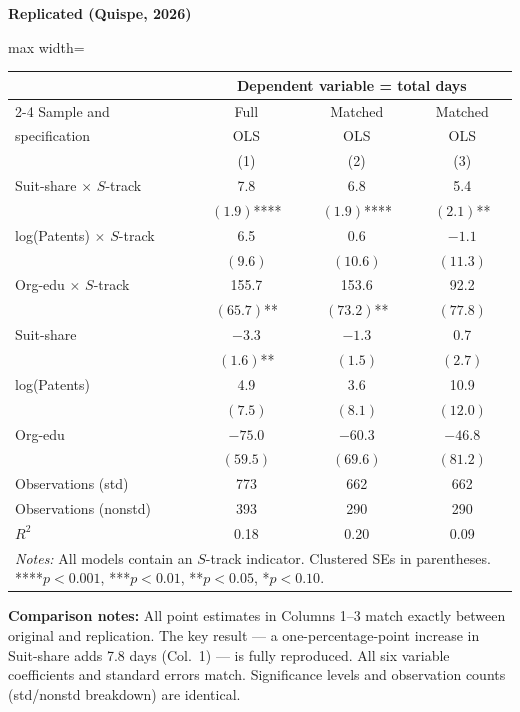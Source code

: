 \documentclass[11pt,a4paper]{article}
\begin{document}
\hfill
\begin{minipage}[t]{0.48\textwidth}
\centering
\textbf{\large Replicated (Quispe, 2026)}
\vspace{0.3cm}

\begin{adjustbox}{max width=\textwidth}
\begin{tabular}{lccc}
\toprule
 & \multicolumn{3}{c}{Dependent variable = total days} \\
\cmidrule(lr){2-4}
Sample and & Full & Matched & Matched \\
specification & OLS & OLS & OLS \\
 & (1) & (2) & (3) \\
\midrule
Suit-share $\times$ $S$-track & 7.8 & 6.8 & 5.4 \\
 & $(1.9)$**** & $(1.9)$**** & $(2.1)$** \\[0.3em]
log(Patents) $\times$ $S$-track & 6.5 & 0.6 & $-1.1$ \\
 & $(9.6)$ & $(10.6)$ & $(11.3)$ \\[0.3em]
Org-edu $\times$ $S$-track & 155.7 & 153.6 & 92.2 \\
 & $(65.7)$** & $(73.2)$** & $(77.8)$ \\[0.3em]
Suit-share & $-3.3$ & $-1.3$ & 0.7 \\
 & $(1.6)$** & $(1.5)$ & $(2.7)$ \\[0.3em]
log(Patents) & 4.9 & 3.6 & 10.9 \\
 & $(7.5)$ & $(8.1)$ & $(12.0)$ \\[0.3em]
Org-edu & $-75.0$ & $-60.3$ & $-46.8$ \\
 & $(59.5)$ & $(69.6)$ & $(81.2)$ \\[0.3em]
\midrule
Observations (std) & 773 & 662 & 662 \\
Observations (nonstd) & 393 & 290 & 290 \\
$R^2$ & 0.18 & 0.20 & 0.09 \\
\bottomrule
\multicolumn{4}{p{0.95\textwidth}}{\footnotesize\textit{Notes:} All models contain an $S$-track indicator. Clustered SEs in parentheses. ****$p<0.001$, ***$p<0.01$, **$p<0.05$, *$p<0.10$.}
\end{tabular}
\end{adjustbox}
\end{minipage}

\vspace{1cm}
\textbf{Comparison notes:} All point estimates in Columns 1--3 match exactly between original and replication. The key result --- a one-percentage-point increase in Suit-share adds 7.8 days (Col.\ 1) --- is fully reproduced. All six variable coefficients and standard errors match. Significance levels and observation counts (std/nonstd breakdown) are identical.
\end{document}
